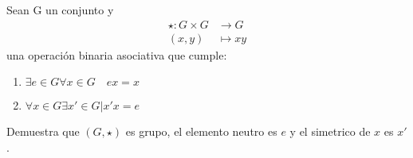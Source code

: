 \question Sean G un conjunto y
\begin{align*}
\star: G\times G &\to G \\
(x,y) &\mapsto xy
\end{align*}
una operación binaria asociativa que cumple:
\begin{enumerate}
\item $\exists {e \in G} \forall x \in G \quad ex = x$
\item $\forall x \in G \exists x' \in G | x'x=e$
\end{enumerate}
Demuestra que $(G,\star)$ es grupo, el elemento neutro es $e$ y 
el simetrico de $x$ es $x'$.